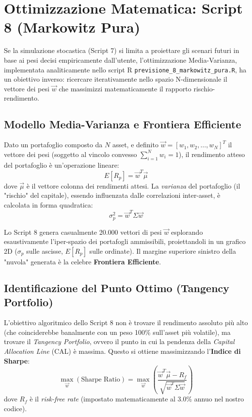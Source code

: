 \chapter{Ottimizzazione Matematica: Script 8 (Markowitz Pura)}

Se la simulazione stocastica (Script 7) si limita a proiettare gli scenari futuri in base ai pesi decisi empiricamente dall'utente, l'ottimizzazione Media-Varianza, implementata analiticamente nello script R \texttt{previsione\_8\_markowitz\_pura.R}, ha un obiettivo inverso: ricercare iterativamente nello spazio N-dimensionale il vettore dei pesi $\vec{w}$ che massimizzi matematicamente il rapporto rischio-rendimento.

\section{Modello Media-Varianza e Frontiera Efficiente}
Dato un portafoglio composto da $N$ asset, e definito $\vec{w} = [w_1, w_2, \dots, w_N]^T$ il vettore dei pesi (soggetto al vincolo convesso $\sum_{i=1}^{N} w_i = 1$), il rendimento atteso del portafoglio \`e un'operazione lineare:
\begin{equation}
E[R_p] = \vec{w}^T \vec{\mu}
\end{equation}
dove $\vec{\mu}$ \`e il vettore colonna dei rendimenti attesi. La \emph{varianza} del portafoglio (il "rischio" del capitale), essendo influenzata dalle correlazioni inter-asset, \`e calcolata in forma quadratica:
\begin{equation}
\sigma_p^2 = \vec{w}^T \Sigma \vec{w}
\end{equation}

Lo Script 8 genera casualmente 20.000 vettori di pesi $\vec{w}$ esplorando esaustivamente l'iper-spazio dei portafogli ammissibili, proiettandoli in un grafico 2D ($\sigma_p$ sulle ascisse, $E[R_p]$ sulle ordinate). Il margine superiore sinistro della "nuvola" generata \`e la celebre \textbf{Frontiera Efficiente}.

\section{Identificazione del Punto Ottimo (Tangency Portfolio)}
L'obiettivo algoritmico dello Script 8 non \`e trovare il rendimento assoluto pi\`u alto (che coinciderebbe banalmente con un peso 100\% sull'asset pi\`u volatile), ma trovare il \emph{Tangency Portfolio}, ovvero il punto in cui la pendenza della \emph{Capital Allocation Line} (CAL) \`e massima. Questo si ottiene massimizzando l'\textbf{Indice di Sharpe}:
\begin{equation}
\max_{\vec{w}} \left( \text{Sharpe Ratio} \right) = \max_{\vec{w}} \left( \frac{\vec{w}^T \vec{\mu} - R_f}{\sqrt{\vec{w}^T \Sigma \vec{w}}} \right)
\end{equation}
dove $R_f$ \`e il \emph{risk-free rate} (impostato matematicamente al 3.0\% annuo nel nostro codice).

